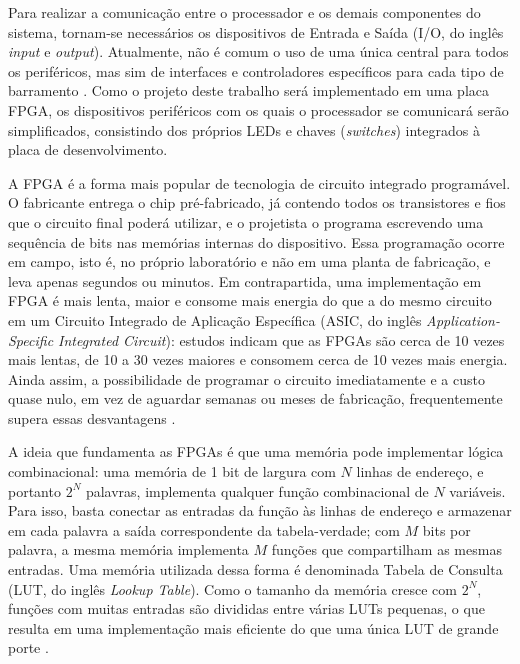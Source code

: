 Para realizar a comunicação entre o processador e os demais componentes do sistema, tornam-se necessários os dispositivos de Entrada e Saída (I/O, do inglês \textit{input} e \textit{output}). Atualmente, não é comum o uso de uma única central para todos os periféricos, mas sim de interfaces e controladores específicos para cada tipo de barramento \cite{silva2024arquitetura}. Como o projeto deste trabalho será implementado em uma placa FPGA, os dispositivos periféricos com os quais o processador se comunicará serão simplificados, consistindo dos próprios LEDs e chaves (\textit{switches}) integrados à placa de desenvolvimento.

A FPGA é a forma mais popular de tecnologia de circuito integrado programável. O fabricante entrega o chip pré-fabricado, já contendo todos os transistores e fios que o circuito final poderá utilizar, e o projetista o programa escrevendo uma sequência de bits nas memórias internas do dispositivo. Essa programação ocorre em campo, isto é, no próprio laboratório e não em uma planta de fabricação, e leva apenas segundos ou minutos. Em contrapartida, uma implementação em FPGA é mais lenta, maior e consome mais energia do que a do mesmo circuito em um Circuito Integrado de Aplicação Específica (ASIC, do inglês \textit{Application-Specific Integrated Circuit}): estudos indicam que as FPGAs são cerca de 10 vezes mais lentas, de 10 a 30 vezes maiores e consomem cerca de 10 vezes mais energia. Ainda assim, a possibilidade de programar o circuito imediatamente e a custo quase nulo, em vez de aguardar semanas ou meses de fabricação, frequentemente supera essas desvantagens \cite{vahid2008sistemas}.

A ideia que fundamenta as FPGAs é que uma memória pode implementar lógica combinacional: uma memória de 1 bit de largura com $N$ linhas de endereço, e portanto $2^N$ palavras, implementa qualquer função combinacional de $N$ variáveis. Para isso, basta conectar as entradas da função às linhas de endereço e armazenar em cada palavra a saída correspondente da tabela-verdade; com $M$ bits por palavra, a mesma memória implementa $M$ funções que compartilham as mesmas entradas. Uma memória utilizada dessa forma é denominada Tabela de Consulta (LUT, do inglês \textit{Lookup Table}). Como o tamanho da memória cresce com $2^N$, funções com muitas entradas são divididas entre várias LUTs pequenas, o que resulta em uma implementação mais eficiente do que uma única LUT de grande porte \cite{vahid2008sistemas}.

